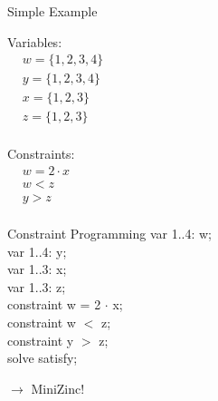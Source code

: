 \documentclass[mathserif,table]{gkibeamer-aaai}
\begin{document}
\begin{frame}{Simple Example}
	\begin{multicols}{2}
		\large{Variables:} \\
		\vspace{0.5cm}
		\hspace{0.5cm}
		$\begin{aligned}
				 & w = \{1, 2, 3, 4\} \\
				 & y = \{1, 2, 3, 4\} \\
				 & x = \{1, 2, 3\}    \\
				 & z = \{1, 2, 3\}    \\
			\end{aligned}$

		\columnbreak

		\large{Constraints:} \\
		\vspace{0.5cm}
		\hspace{0.5cm}
		$\begin{aligned}
				 & w = 2 \cdot x \\
				 & w < z         \\
				 & y > z         \\
			\end{aligned}$
	\end{multicols}
\end{frame}

\begin{frame}{Constraint Programming}
	\hspace{2cm}
	var 1..4: w; \\
	\hspace{2cm}
	var 1..4: y; \\
	\hspace{2cm}
	var 1..3: x; \\
	\hspace{2cm}
	var 1..3: z; \\
	\vspace{0.35cm}
	\hspace{2cm}
	constraint w = 2 $\cdot$ x; \\
	\hspace{2cm}
	constraint w $<$ z; \\
	\hspace{2cm}
	constraint y $>$ z; \\

	\pause
	\vspace{0.35cm}
	\hspace{2cm}
	solve satisfy;

	\pause
	\vspace{0.35cm}
	\hspace{2cm}
	$\rightarrow$ MiniZinc!
\end{frame}
\end{document}
